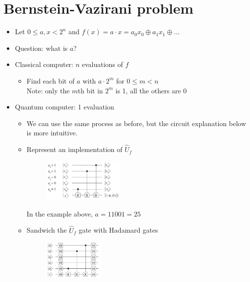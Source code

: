 \documentclass{../doc}
\begin{document}
  \section{Bernstein-Vazirani problem}
    \begin{itemize}
      \item Let $0 \leq a,x < 2^n$ and $f(x) = a \cdot x = a_0 x_0 \oplus a_1 x_1 \oplus \dots$
      \item Question: what is $a$?
      \item Classical computer: $n$ evaluations of $f$
        \begin{itemize}
          \item Find each bit of $a$ with $a \cdot 2^m$ for $0 \leq m < n$ \\
            Note: only the $m$th bit in $2^m$ is 1, all the others are 0
        \end{itemize}
      \item Quantum computer: 1 evaluation
        \begin{itemize}
          \item We can use the same process as before, but the circuit explanation below is more intuitive.
          \item Represent an implementation of $\hat U_f$
            \begin{figure}[H]
              \centering
              \includegraphics[width=0.4\textwidth]{assets/fig2.8.png}
              \caption{}
            \end{figure}
            In the example above, $a = 11001 = 25$
          \item Sandwich the $\hat U_f$ gate with Hadamard gates
            \begin{figure}[H]
              \centering
              \includegraphics[width=0.3\textwidth]{assets/fig2.9.png}
              \caption{}
            \end{figure}

\end{itemize}
\end{itemize}
\end{document}
